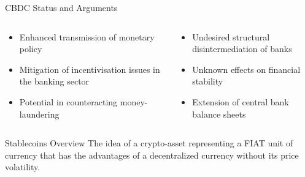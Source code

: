 \documentclass[handout]{beamer}
\begin{document}
\begin{frame}{CBDC Status and Arguments}
{\begin{columns}[T]
	\begin{column}{0.45\textwidth}
	\footnotesize{
		\begin{itemize}
			\item Enhanced transmission of monetary policy
			\item Mitigation of incentivisation issues in the banking sector
			\item Potential in counteracting money-laundering
		\end{itemize}
		}
	\end{column}
	\begin{column}{0.45\textwidth}
	\footnotesize{
		\begin{itemize}
			\item Undesired structural disintermediation of banks 
			\item Unknown effects on financial stability
			\item Extension of central bank balance sheets
		\end{itemize}
		}
	\end{column}
\end{columns}
}

\end{frame}

\begin{frame}{Stablecoins Overview}
The idea of a crypto-asset representing \color{focus} a FIAT unit of currency \color{black} that has the advantages of a decentralized currency without its \color{focus}price volatility\color{black}.

\vspace{1.5em}


\end{frame}
\end{document}
